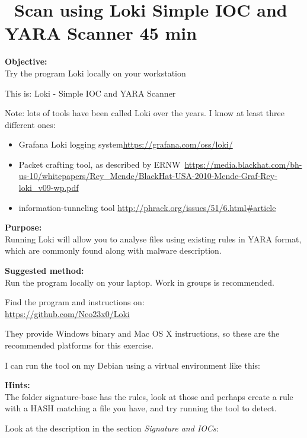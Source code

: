 \documentclass[a4paper,11pt,notitlepage]{report}
\begin{document}
\chapter{\faExclamationTriangle\ Scan using Loki Simple IOC and YARA Scanner 45 min}
\label{ex:loki-ioc-yara}

{\bf Objective:}\\
Try the program Loki locally on your workstation

This is: Loki - Simple IOC and YARA Scanner

Note: lots of tools have been called Loki over the years. I know at least three different ones:
\begin{itemize}
\item Grafana Loki logging system\url{https://grafana.com/oss/loki/}
\item Packet crafting tool, as described by ERNW\
\url{https://media.blackhat.com/bh-us-10/whitepapers/Rey_Mende/BlackHat-USA-2010-Mende-Graf-Rey-loki_v09-wp.pdf}
\item information-tunneling tool \url{http://phrack.org/issues/51/6.html#article}
\end{itemize}


{\bf Purpose:}\\
Running Loki will allow you to analyse files using existing rules in YARA format, which are commonly found along with malware description.


{\bf Suggested method:}\\
Run the program locally on your laptop. Work in groups is recommended.

Find the program and instructions on:\\
\url{https://github.com/Neo23x0/Loki}

They provide Windows binary and Mac OS X instructions, so these are the recommended platforms for this exercise.

I can run the tool on my Debian using a virtual environment like this:
\hlkimage{12cm}{loki-venv.png}


{\bf Hints:}\\
The folder signature-base has the rules, look at those and perhaps create a rule with a HASH matching a file you have, and try running the tool to detect.

Look at the description in the section \emph{Signature and IOCs}:
\end{document}
